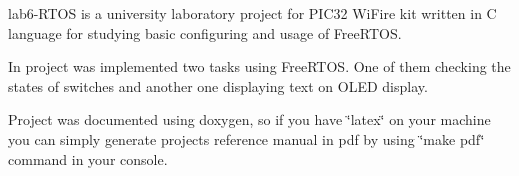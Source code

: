 lab6-\/\+R\+T\+OS is a university laboratory project for P\+I\+C32 Wi\+Fire kit written in C language for studying basic configuring and usage of Free\+R\+T\+OS.

In project was implemented two tasks using Free\+R\+T\+OS. One of them checking the states of switches and another one displaying text on O\+L\+ED display.

Project was documented using doxygen, so if you have \char`\"{}latex\char`\"{} on your machine you can simply generate project\textquotesingle{}s reference manual in pdf by using \char`\"{}make pdf\char`\"{} command in your console. 